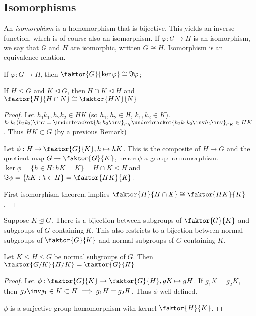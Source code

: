 \subsection{Isomorphisms}
An \textit{isomorphism} is a homomorphism that is bijective.
This yields an inverse function, which is of course also an isomorphism.
If $\varphi : G \to H$ is an isomorphism, we say that $G$ and $H$ are isomorphic, written $G \cong H$.
Isomorphism is an equivalence relation.

\begin{theorem}
	If $\varphi : G \to H$, then $\faktor{G}{\ker \varphi} \cong \Im \varphi$;
\end{theorem}

\begin{theorem}
	If $H \leq G$ and $K \trianglelefteq G$, then $H \cap K \trianglelefteq H$ and $\faktor{H}{H \cap N} \cong \faktor{HN}{N}$
\end{theorem}

\begin{proof}
	Let $h_1 k_1, h_2 k_2 \in HK$ (so $h_1, h_2 \in H$, $k_1, k_2 \in K$).
	$h_1 k_1 (h_2 k_2)\inv = \underbracket{h_1 h_2\inv}_{\in H} \underbracket{h_2 k_1 k_2\inv h_2\inv}_{\in K} \in HK$.
	Thus $HK \subset G$ (by a previous Remark)

	Let $\phi : H \to \faktor{G}{K}, h \mapsto hK$.
	This is the composite of $H \to G$ and the quotient map $G \to \faktor{G}{K}$, hence $\phi$ a group homomorphism.
	$\ker \phi = \{h \in H : hK = K\} = H \cap K \trianglelefteq H$ and $\Im \phi = \{hK : h \in H\} = \faktor{HK}{K}$.

	First isomorphism theorem implies $\faktor{H}{H \cap K} \cong \faktor{HK}{K}$.
\end{proof} 

\begin{remark}
	Suppose $K \trianglelefteq G$.
	There is a bijection between subgroups of $\faktor{G}{K}$ and subgroups of $G$ containing $K$.
	This also restricts to a bijection between normal subgroups of $\faktor{G}{K}$ and normal subgroups of $G$ containing $K$.
\end{remark} 

\begin{theorem}
	Let $K \leq H \leq G$ be normal subgroups of $G$.
	Then $\faktor{G/K}{H/K} = \faktor{G}{H}$
\end{theorem}

\begin{proof}
	Let $\phi : \faktor{G}{K} \to \faktor{G}{H}, gK \mapsto gH$.
	If $g_1 K = g_2 K$, then $g_2\inv g_1 \in K \subset H \implies g_1 H = g_2 H$.
	Thus $\phi$ well-defined.

	$\phi$ is a surjective group homomorphism with kernel $\faktor{H}{K}$.
\end{proof} 